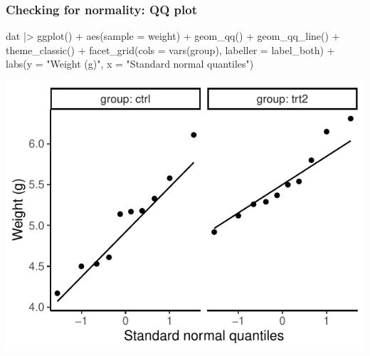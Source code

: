 \documentclass[a4paper]{article}
\begin{document}
\subsubsection{Checking for normality: QQ plot}
\begin{Schunk}
\begin{Sinput}
dat |> 
  ggplot() + aes(sample = weight) + 
  geom_qq() + geom_qq_line() + 
  theme_classic() +
  facet_grid(cols = vars(group), labeller = label_both) + 
  labs(y = "Weight (g)", x = "Standard normal quantiles")
\end{Sinput}


{\centering \includegraphics[width=\maxwidth]{figure/listings-unnamed-chunk-139-1} 

}

\end{Schunk}
\end{document}
